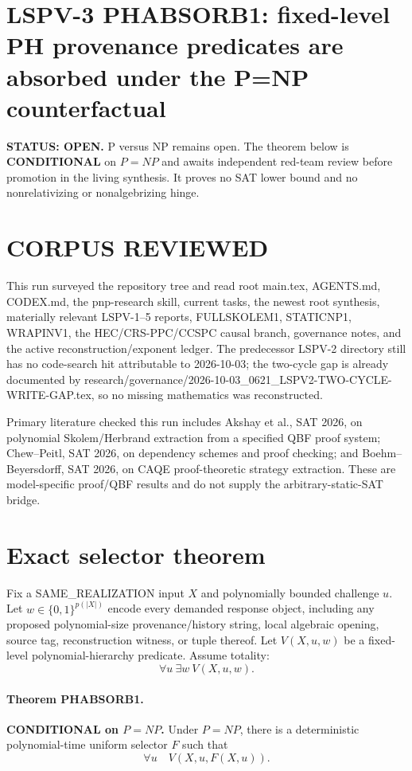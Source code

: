 \documentclass[11pt]{article}
\begin{document}
\section*{LSPV-3 PHABSORB1: fixed-level PH provenance predicates are absorbed under the P=NP counterfactual}
\textbf{STATUS: OPEN.} P versus NP remains open. The theorem below is \textbf{CONDITIONAL} on \(P=NP\) and awaits independent red-team review before promotion in the living synthesis. It proves no SAT lower bound and no nonrelativizing or nonalgebrizing hinge.

\section*{CORPUS REVIEWED}
This run surveyed the repository tree and read root main.tex, AGENTS.md, CODEX.md, the pnp-research skill, current tasks, the newest root synthesis, materially relevant LSPV-1--5 reports, FULLSKOLEM1, STATICNP1, WRAPINV1, the HEC/CRS-PPC/CCSPC causal branch, governance notes, and the active reconstruction/exponent ledger. The predecessor LSPV-2 directory still has no code-search hit attributable to 2026-10-03; the two-cycle gap is already documented by research/governance/2026-10-03_0621_LSPV2-TWO-CYCLE-WRITE-GAP.tex, so no missing mathematics was reconstructed.

Primary literature checked this run includes Akshay et al., SAT 2026, on polynomial Skolem/Herbrand extraction from a specified QBF proof system; Chew--Peitl, SAT 2026, on dependency schemes and proof checking; and Boehm--Beyersdorff, SAT 2026, on CAQE proof-theoretic strategy extraction. These are model-specific proof/QBF results and do not supply the arbitrary-static-SAT bridge.

\section*{Exact selector theorem}
Fix a SAME\_REALIZATION input \(X\) and polynomially bounded challenge \(u\). Let \(w\in\{0,1\}^{p(|X|)}\) encode every demanded response object, including any proposed polynomial-size provenance/history string, local algebraic opening, source tag, reconstruction witness, or tuple thereof. Let \(V(X,u,w)\) be a fixed-level polynomial-hierarchy predicate. Assume totality:
\[
\forall u\ \exists w\ V(X,u,w).
\]

\paragraph{Theorem PHABSORB1.}
\textbf{CONDITIONAL on \(P=NP\).} Under \(P=NP\), there is a deterministic polynomial-time uniform selector \(F\) such that
\[
\forall u\quad V(X,u,F(X,u)).
\]
\end{document}

